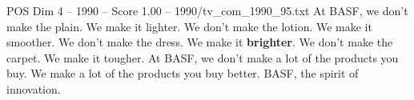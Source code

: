\begin{textsample}{POS Dim 4 – 1990 – Score 1.00 – 1990/tv\_com\_1990\_95.txt}  \label{ex:f4_pos_029}
At BASF, we don't make the plain.
We make it lighter.
We don't make the lotion.
We make it smoother.
We don't make the dress.
We make it \textbf{brighter}.
We don't make the carpet.
We make it tougher.
At BASF, we don't make a lot of the products you buy.
We make a lot of the products you buy better.
BASF, the spirit of innovation.

\end{textsample}
